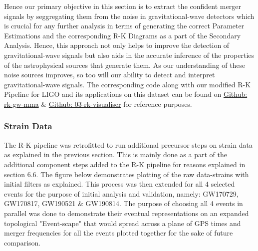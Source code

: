 Hence our primary objective in this section is to extract the confident merger signals by seggregating them from the noise in gravitational-wave detectors which is crucial for any further analysis in terms of generating the correct Parameter Estimations and the corresponding R-K Diagrams as a part of the Secondary Analysis. Hence, this approach not only helps to improve the detection of gravitational-wave signals but also aids in the accurate inference of the properties of the astrophysical sources that generate them. As our understanding of these noise sources improves, so too will our ability to detect and interpret gravitational-wave signals. \cite{24.4_CompactBinaryParameterEstimates} \cite{24.6_LIGOParameterEstimates} \cite{24.5_GWParameterEsitmation}The corresponding code along with our modified R-K Pipeline for LIGO and its applications on this dataset can be found on \href{https://github.com/animikhroy/rk_toolkit_pipeline_diagrams/tree/main/02_notebooks/rk_gw_mma}{Github: rk-gw-mma} \& \href{https://github.com/animikhroy/rk_toolkit_pipeline_diagrams/tree/main/03_rk-visualizer}{Github: 03-rk-visualiser} for reference purposes.


\subsubsection{Strain Data}

    The R-K pipeline was retrofitted to run additional precursor steps on strain data as explained in the previous section. This is mainly done as a part of the additional component steps added to the R-K pipeline for reasons explained in section 6.6. The figure below demonstrates plotting of the raw data-strains with initial filters as explained. This process was then extended for all 4 selected events for the purpose of initial analysis and validation, namely:  GW170729, GW170817, GW190521 \& GW190814. The purpose of choosing all 4 events in parallel was done to demonstrate their eventual representations on an expanded topological "Event-scape" that would spread across a plane of GPS times and merger frequencies for all the events plotted together for the sake of future comparison.



